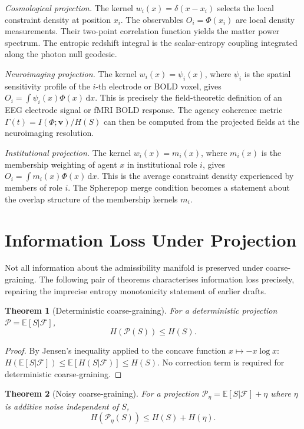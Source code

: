 \documentclass[12pt, oneside]{book}
\theoremstyle{plain}
\newtheorem{theorem}{Theorem}[chapter]
\theoremstyle{definition}
\newcommand{\vfield}{\mathbf{v}}
\newcommand{\dd}{\mathrm{d}}
\begin{document}
\textit{Cosmological projection.} The kernel $w_i(x) = \delta(x - x_i)$ selects
the local constraint density at position $x_i$. The observables $O_i = \Phi(x_i)$
are local density measurements. Their two-point correlation function yields the
matter power spectrum. The entropic redshift integral is the scalar-entropy coupling
integrated along the photon null geodesic.

\textit{Neuroimaging projection.} The kernel $w_i(x) = \psi_i(x)$, where $\psi_i$
is the spatial sensitivity profile of the $i$-th electrode or BOLD voxel, gives
$O_i = \int\psi_i(x)\Phi(x)\, \dd x$. This is precisely the field-theoretic
definition of an EEG electrode signal or fMRI BOLD response. The agency coherence
metric $\Gamma(t) = I(\Phi;\vfield)/H(S)$ can then be computed from the projected
fields at the neuroimaging resolution.

\textit{Institutional projection.} The kernel $w_i(x) = m_i(x)$, where $m_i(x)$
is the membership weighting of agent $x$ in institutional role $i$, gives
$O_i = \int m_i(x)\Phi(x)\, \dd x$. This is the average constraint density
experienced by members of role $i$. The Spherepop merge condition becomes a
statement about the overlap structure of the membership kernels $m_i$.

\section{Information Loss Under Projection}
\label{sec:info-loss}

Not all information about the admissibility manifold is preserved under
coarse-graining. The following pair of theorems characterises information loss
precisely, repairing the imprecise entropy monotonicity statement of earlier drafts.

\begin{theorem}[Deterministic coarse-graining]
\label{thm:det-cg}
For a deterministic projection $\mathcal{P} = \mathbb{E}[S|\mathcal{F}]$,
\[
  H(\mathcal{P}(S)) \leq H(S).
\]
\end{theorem}

\begin{proof}
By Jensen's inequality applied to the concave function $x\mapsto -x\log x$:
$H(\mathbb{E}[S|\mathcal{F}]) \leq \mathbb{E}[H(S|\mathcal{F})] \leq H(S)$.
No correction term is required for deterministic coarse-graining.
\end{proof}

\begin{theorem}[Noisy coarse-graining]
\label{thm:noisy-cg}
For a projection $\mathcal{P}_\eta = \mathbb{E}[S|\mathcal{F}] + \eta$ where $\eta$
is additive noise independent of $S$,
\[
  H(\mathcal{P}_\eta(S)) \leq H(S) + H(\eta).
\]
\end{theorem}
\end{document}
